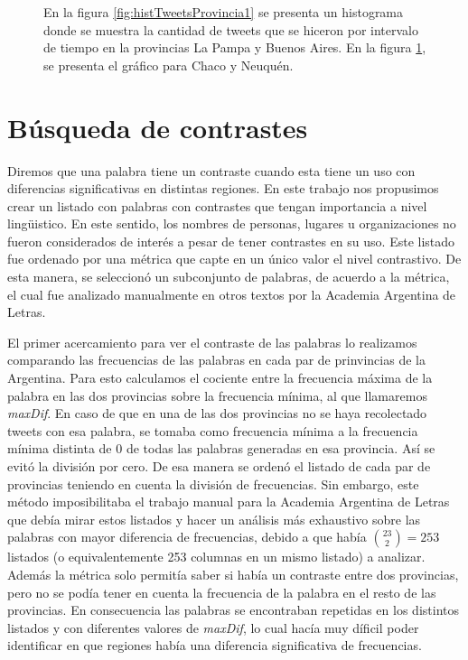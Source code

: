 \begin{figure}[!ht]
\begin {minipage}{0.49\textwidth}
     \caption{}
     \label{fig:histTweetsProvincia2}
   \end{minipage}
   \caption { En la figura \ref{fig:histTweetsProvincia1} se presenta un histograma donde se muestra la cantidad de tweets que se hiceron por intervalo de tiempo en la provincias La Pampa y Buenos Aires. En la figura \ref{fig:histTweetsProvincia2}, se presenta el gráfico para Chaco y Neuquén.}
\end{figure}




\section{Búsqueda de contrastes}

Diremos que una palabra tiene un contraste cuando esta tiene un uso con diferencias significativas en
distintas regiones. En este trabajo nos propusimos crear un listado con palabras con contrastes que tengan
importancia a nivel lingüistico. En este sentido, los nombres de personas, lugares u organizaciones no 
fueron considerados de interés a pesar de tener contrastes en su uso.
Este listado fue ordenado por una métrica que capte en un único valor el nivel contrastivo. De esta manera, 
se seleccionó un subconjunto de palabras, de acuerdo a la métrica, el cual fue analizado manualmente en otros textos por la Academia Argentina de Letras.

El primer acercamiento para ver el contraste de las palabras lo realizamos comparando las frecuencias de las palabras 
en cada par de prinvincias de la Argentina. Para esto calculamos el cociente entre la frecuencia máxima de la palabra
en las dos provincias sobre la frecuencia mínima, al que llamaremos \textit{maxDif}. En caso de que en una de las dos provincias no se haya 
recolectado tweets con esa palabra, se tomaba como frecuencia mínima a la frecuencia mínima distinta de 0 de todas las palabras generadas en esa provincia. Así se evitó la división por cero.
De esa manera se ordenó el listado de cada par de provincias teniendo en cuenta la división de frecuencias. 
Sin embargo, este método imposibilitaba el trabajo manual para la Academia Argentina de Letras que debía mirar estos listados y hacer un análisis más exhaustivo sobre las palabras con mayor diferencia de frecuencias, debido a que había $\binom{23}{2} = 253$
listados (o equivalentemente 253 columnas en un mismo listado) a analizar. Además la métrica solo permitía saber si había un contraste entre dos provincias, pero no se podía tener en cuenta la frecuencia de la palabra en el resto de las provincias. 
En consecuencia las palabras se encontraban repetidas en los distintos listados y con diferentes valores de \textit{maxDif}, lo cual hacía muy díficil poder identificar en que regiones había una diferencia significativa de frecuencias.

